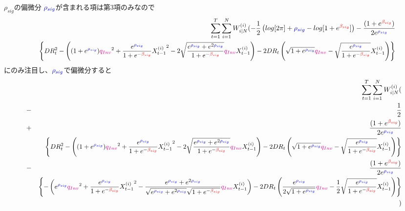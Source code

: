 \documentclass[a4j,11pt]{jarticle}
\makeatletter
\def\subsection{\@startsection{subsection}{1}{\z@}
   {0\Cvs \@plus.5\Cdp \@minus.2\Cdp}
   {0.01\Cvs \@plus.3\Cdp}
   {\normalfont \normalsize \bfseries}}
\makeatother
\begin{document}
\subsection{$\rho_{sig}$の偏微分}
$\textcolor{blue}{\rho_{sig}}$が含まれる項は第3項のみなので
\begin{eqnarray*}
&&\sum_{t=1}^{T}\sum_{i=1}^{N}W_{i|N}^{(i)}
(-\frac{1}{2} \left(log[2\pi] + \textcolor{blue}{\rho_{sig}} - log[1+e^{\textcolor{red}{\beta_{sig}}}]\right)
-\frac{(1+e^{\textcolor{red}{\beta_{sig}}})}{2e^{\textcolor{blue}{\rho_{sig}}}}\\
&&
\scalebox{0.95}{$\displaystyle
\left\{DR_t^2-
\left((1+ e^{\textcolor{blue}{\rho_{sig}}} ) \textcolor{magenta}{q_{Inv}}^2+\frac{e^{\textcolor{blue}{\rho_{sig}}}}{1+e^{-\textcolor{red}{\beta_{sig}}}}{X_{t-1}^{(i)}}^2 - 2 \sqrt{\frac{e^{\textcolor{blue}{\rho_{sig}}} + e^{2\textcolor{blue}{\rho_{sig}}} }{1+e^{-\textcolor{red}{\beta_{sig}}}} }\textcolor{magenta}{q_{Inv}}X_{t-1}^{(i)}\right)
 - 2DR_t
\left(\sqrt{1+e^{\textcolor{blue}{\rho_{sig}}}} \textcolor{magenta}{q_{Inv}}-\sqrt{\frac{e^{\textcolor{blue}{\rho_{sig}}}}{1+e^{-\textcolor{red}{\beta_{sig}}}}}X_{t-1}^{(i)}\right)
 \right\}
$}
\end{eqnarray*}
にのみ注目し、$\textcolor{blue}{\rho_{sig}}$で偏微分すると
\begin{eqnarray}
&&\sum_{t=1}^{T}\sum_{i=1}^{N}W_{i|N}^{(i)}(\nonumber \\
&-&\frac{1}{2}\nonumber\\
&+&\frac{(1+e^{\textcolor{red}{\beta_{sig}}})}{2e^{\textcolor{blue}{\rho_{sig}}}}
\nonumber\\
&&
\scalebox{0.95}{$\displaystyle
\left\{DR_t^2-
\left((1+ e^{\textcolor{blue}{\rho_{sig}}} ) \textcolor{magenta}{q_{Inv}}^2+\frac{e^{\textcolor{blue}{\rho_{sig}}}}{1+e^{-\textcolor{red}{\beta_{sig}}}}{X_{t-1}^{(i)}}^2 - 2 \sqrt{\frac{e^{\textcolor{blue}{\rho_{sig}}} + e^{2\textcolor{blue}{\rho_{sig}}} }{1+e^{-\textcolor{red}{\beta_{sig}}}} }\textcolor{magenta}{q_{Inv}}X_{t-1}^{(i)}\right)
 - 2DR_t
\left(\sqrt{1+e^{\textcolor{blue}{\rho_{sig}}}} \textcolor{magenta}{q_{Inv}}-\sqrt{\frac{e^{\textcolor{blue}{\rho_{sig}}}}{1+e^{-\textcolor{red}{\beta_{sig}}}}}X_{t-1}^{(i)}\right)
 \right\}
$}\nonumber\\
&-&\frac{(1+e^{\textcolor{red}{\beta_{sig}}})}{2e^{\textcolor{blue}{\rho_{sig}}}}\nonumber\\
&&
\scalebox{0.95}{$\displaystyle
\left\{-
\left( e^{\textcolor{blue}{\rho_{sig}}}  \textcolor{magenta}{q_{Inv}}^2+\frac{e^{\textcolor{blue}{\rho_{sig}}}}{1+e^{-\textcolor{red}{\beta_{sig}}}}{X_{t-1}^{(i)}}^2 -  \frac{ e^{\textcolor{blue}{\rho_{sig}}}+e^{2\textcolor{blue}{\rho_{sig}}} }{\sqrt{e^{\textcolor{blue}{\rho_{sig}}}+e^{2\textcolor{blue}{\rho_{sig}}}}\sqrt{1+e^{-\textcolor{red}{\beta_{sig}}}} }\textcolor{magenta}{q_{Inv}}X_{t-1}^{(i)}\right)
 - 2DR_t
\left(\frac{e^{\textcolor{blue}{\rho_{sig}}}}{2\sqrt{1+e^{\textcolor{blue}{\rho_{sig}}}}} \textcolor{magenta}{q_{Inv}}-\frac{1}{2}\sqrt{\frac{e^{\textcolor{blue}{\rho_{sig}}}}{1+e^{-\textcolor{red}{\beta_{sig}}}}}X_{t-1}^{(i)}\right)
 \right\}
$}\nonumber\\
&&)
\end{eqnarray}
\end{document}
